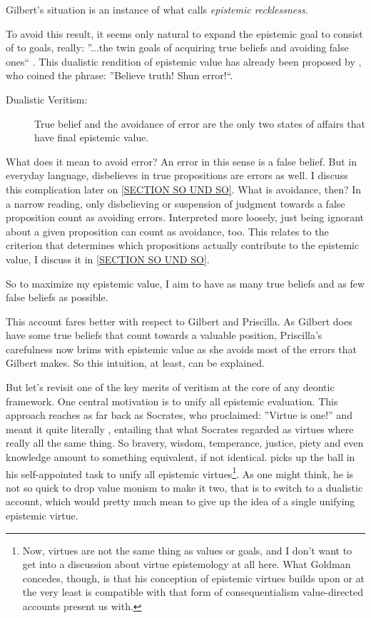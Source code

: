 \documentclass[12pt,numbers=noenddot]{scrartcl}
\begin{document}
Gilbert’s situation is an instance of what \textcite[360]{Berker2013-BERETA-2} calls \emph{epistemic recklessness}. 

To avoid this result, it seems only natural to expand the epistemic goal to consist of to goals, really: ”...the twin goals of acquiring true beliefs and avoiding false ones“ \textcite[339]{Berker2013-BERETA-2}. This dualistic rendition of epistemic value has already been proposed by \textcite[17]{James1896-JAMTWT-19}, who coined the phrase: ”Believe truth! Shun error!“.

\begin{description}
    \item[Dualistic Veritism:] True belief and the avoidance of error are the only two states of affairs that have final epistemic value.
\end{description}
\label{SECTION SO UND SO}
What does it mean to avoid error? An error in this sense \textcite[362]{Berker2013-BERETA-2} is a false belief. But in everyday language, disbelieves in true propositions are errors as well. I discuss this complication later on \ref{SECTION SO UND SO}. What is avoidance, then? In a narrow reading, only disbelieving or suspension of judgment towards a false proposition count as avoiding errors. Interpreted more loosely, just being ignorant about a given proposition can count as avoidance, too. This relates to the criterion that determines which propositions actually contribute to the epistemic value, I discuss it in \ref{SECTION SO UND SO}.

So to maximize my epistemic value, I aim to have as many true beliefs and as few false beliefs as possible.

This account fares better with respect to Gilbert and Priscilla. As Gilbert does have some true beliefs that count towards a valuable position, Priscilla’s carefulness now brims with epistemic value as she avoids most of the errors that Gilbert makes. So this intuition, at least, can be explained.

But let's revisit one of the key merits of veritism at the core of any deontic framework. One central motivation is to unify all epistemic evaluation. This approach reaches as far back as Socrates, who proclaimed: ”Virtue is one!” and meant it quite literally \textcite{penner1973}, entailing that what Socrates regarded as virtues where really all the same thing. So bravery, wisdom, temperance, justice, piety and even knowledge amount to something equivalent, if not identical.
\textcite{Goldman2002-GOLTUO-2} picks up the ball in his self-appointed task to unify all epistemic virtues\footnote{Now, virtues are not the same thing as values or goals, and I don't want to get into a discussion about virtue epistemology at all here. What Goldman concedes, though, is that his conception of epistemic virtues builds upon or at the very least is compatible with that form of consequentialism value-directed accounts present us with.}. As one might think, he is not so quick to drop value monism to make it two, that is to switch to a dualistic account, which would pretty much mean to give up the idea of a single unifying epistemic virtue.
\end{document}
